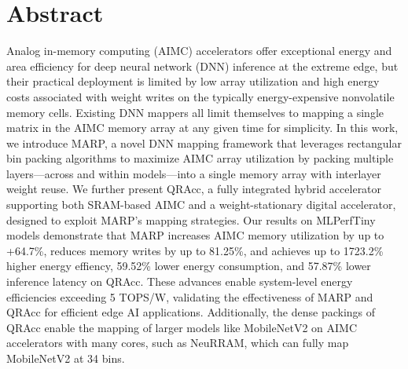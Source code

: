 \chapter*{Abstract}
    
Analog in-memory computing (AIMC) accelerators offer exceptional energy and area efficiency for deep neural network (DNN) inference at the extreme edge, but their practical deployment is limited by low array utilization and high energy costs associated with weight writes on the typically energy-expensive nonvolatile memory cells. Existing DNN mappers all limit themselves to mapping a single matrix in the AIMC memory array at any given time for simplicity. In this work, we introduce MARP, a novel DNN mapping framework that leverages rectangular bin packing algorithms to maximize AIMC array utilization by packing multiple layers—across and within models—into a single memory array with interlayer weight reuse. We further present QRAcc, a fully integrated hybrid accelerator supporting both SRAM-based AIMC and a weight-stationary digital accelerator, designed to exploit MARP’s mapping strategies. Our results on MLPerfTiny models demonstrate that MARP increases AIMC memory utilization by up to +64.7\%, reduces memory writes by up to 81.25\%, and achieves up to 1723.2\% higher energy effiency, 59.52\% lower energy consumption, and 57.87\% lower inference latency on QRAcc. These advances enable system-level energy efficiencies exceeding 5 TOPS/W, validating the effectiveness of MARP and QRAcc for efficient edge AI applications. Additionally, the dense packings of QRAcc enable the mapping of larger models like MobileNetV2 on AIMC accelerators with many cores, such as NeuRRAM, which can fully map MobileNetV2 at 34 bins.